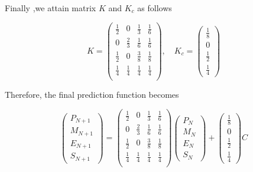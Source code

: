 \documentclass{mcmthesis}
\begin{document}
	Finally ,we attain matrix $K$ and $K_c$ as follows
	\begin{spacing}{1.5}
		$$
		K = 
		\left(
		\begin{matrix}
		\frac{1}{2} & 0 & \frac{1}{3} & \frac{1}{6} \\
		0 & \frac{2}{3} & \frac{1}{6} & \frac{1}{6} \\
		\frac{1}{2} & 0 & \frac{3}{8} & \frac{1}{8} \\
		\frac{1}{4} &\frac{1}{4} & \frac{1}{4} & \frac{1}{4} \\
		\end{matrix}
		\right) 
		, \quad K_c = 
		\left(
		\begin{matrix}
		\frac{1}{8} \\ {0} \\ \frac{1}{2} \\ \frac{1}{4}
		\end{matrix}
		\right) 
		$$
	\end{spacing}
	Therefore, the final prediction function becomes
	\begin{spacing}{1.5}
		\begin{equation}
		\left(
		\begin{matrix}
		P_{N+1} \\ M_{N+1} \\ E_{N+1} \\ S_{N+1}
		\end{matrix}
		\right) 
		= 
		\left(
		\begin{matrix}
		\frac{1}{2} & 0 & \frac{1}{3} & \frac{1}{6} \\
		0 & \frac{2}{3} & \frac{1}{6} & \frac{1}{6} \\
		\frac{1}{2} & 0 & \frac{3}{8} & \frac{1}{8} \\
		\frac{1}{4} &\frac{1}{4} & \frac{1}{4} & \frac{1}{4} \\
		\end{matrix}
		\right) 
		\left(
		\begin{matrix}
		P_N \\ M_N \\ E_N \\ S_N
		\end{matrix}
		\right) 
		+
		\left(
		\begin{matrix}
		\frac{1}{8} \\ {0} \\ \frac{1}{2} \\ \frac{1}{4}
		\end{matrix}
		\right) 
		C
		\end{equation}
	\end{spacing}	
	
\end{document}
